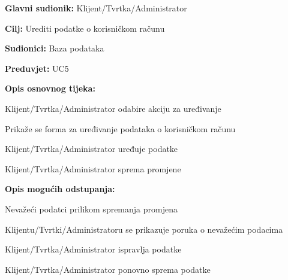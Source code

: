 \noindent {}
\begin{packed_item}
	
	\item \textbf{Glavni sudionik:} Klijent/Tvrtka/Administrator
	\item  \textbf{Cilj:} Urediti podatke o korisničkom računu
	\item  \textbf{Sudionici:} Baza podataka
	\item  \textbf{Preduvjet:} UC5
	\item  \textbf{Opis osnovnog tijeka:}
	
	\item[] \begin{packed_enum}
		
		\item Klijent/Tvrtka/Administrator odabire akciju za uređivanje
		\item Prikaže se forma za uređivanje podataka o korisničkom računu
		\item Klijent/Tvrtka/Administrator uređuje podatke
		\item Klijent/Tvrtka/Administrator sprema promjene
	
	\end{packed_enum}
	
	\item  \textbf{Opis mogućih odstupanja:}
	
	\item[] \begin{packed_item}
		
		\item[6.a] Nevažeći podatci prilikom spremanja promjena
		\item[] \begin{packed_enum}
			
			\item Klijentu/Tvrtki/Administratoru se prikazuje poruka o nevažećim podacima
			\item Klijent/Tvrtka/Administrator ispravlja podatke
			\item Klijent/Tvrtka/Administrator ponovno sprema podatke
			
		\end{packed_enum}
		
	\end{packed_item}
\end{packed_item}

